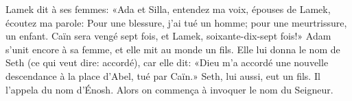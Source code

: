 Lamek dit à ses femmes: «Ada et Silla, entendez ma voix,
	épouses de Lamek, écoutez ma parole:
	Pour une blessure, j’ai tué un homme;
		pour une meurtrissure, un enfant.
Caïn sera vengé sept fois, et Lamek, soixante-dix-sept fois!»
Adam s’unit encore à sa femme, et elle mit au monde un fils.
Elle lui donna le nom de Seth (ce qui veut dire: accordé),
	car elle dit: «Dieu m’a accordé une nouvelle descendance
	à la place d’Abel, tué par Caïn.»
Seth, lui aussi, eut un fils. Il l’appela du nom d’Énosh.
	Alors on commença à invoquer le nom du Seigneur.
